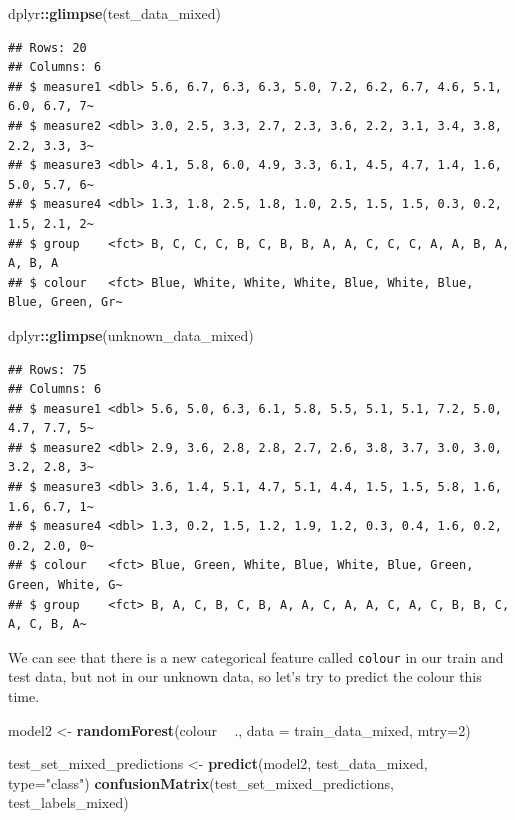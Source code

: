 \documentclass[
]{book}
\newenvironment{Shaded}{\begin{snugshade}}{\end{snugshade}}
\newcommand{\DataTypeTok}[1]{\textcolor[rgb]{0.13,0.29,0.53}{#1}}
\newcommand{\DecValTok}[1]{\textcolor[rgb]{0.00,0.00,0.81}{#1}}
\newcommand{\KeywordTok}[1]{\textcolor[rgb]{0.13,0.29,0.53}{\textbf{#1}}}
\newcommand{\NormalTok}[1]{#1}
\newcommand{\OperatorTok}[1]{\textcolor[rgb]{0.81,0.36,0.00}{\textbf{#1}}}
\newcommand{\StringTok}[1]{\textcolor[rgb]{0.31,0.60,0.02}{#1}}
\begin{document}
\begin{Shaded}
\begin{Highlighting}[]
\NormalTok{dplyr}\OperatorTok{::}\KeywordTok{glimpse}\NormalTok{(test_data_mixed)}
\end{Highlighting}
\end{Shaded}

\begin{verbatim}
## Rows: 20
## Columns: 6
## $ measure1 <dbl> 5.6, 6.7, 6.3, 6.3, 5.0, 7.2, 6.2, 6.7, 4.6, 5.1, 6.0, 6.7, 7~
## $ measure2 <dbl> 3.0, 2.5, 3.3, 2.7, 2.3, 3.6, 2.2, 3.1, 3.4, 3.8, 2.2, 3.3, 3~
## $ measure3 <dbl> 4.1, 5.8, 6.0, 4.9, 3.3, 6.1, 4.5, 4.7, 1.4, 1.6, 5.0, 5.7, 6~
## $ measure4 <dbl> 1.3, 1.8, 2.5, 1.8, 1.0, 2.5, 1.5, 1.5, 0.3, 0.2, 1.5, 2.1, 2~
## $ group    <fct> B, C, C, C, B, C, B, B, A, A, C, C, C, A, A, B, A, A, B, A
## $ colour   <fct> Blue, White, White, White, Blue, White, Blue, Blue, Green, Gr~
\end{verbatim}

\begin{Shaded}
\begin{Highlighting}[]
\NormalTok{dplyr}\OperatorTok{::}\KeywordTok{glimpse}\NormalTok{(unknown_data_mixed)}
\end{Highlighting}
\end{Shaded}

\begin{verbatim}
## Rows: 75
## Columns: 6
## $ measure1 <dbl> 5.6, 5.0, 6.3, 6.1, 5.8, 5.5, 5.1, 5.1, 7.2, 5.0, 4.7, 7.7, 5~
## $ measure2 <dbl> 2.9, 3.6, 2.8, 2.8, 2.7, 2.6, 3.8, 3.7, 3.0, 3.0, 3.2, 2.8, 3~
## $ measure3 <dbl> 3.6, 1.4, 5.1, 4.7, 5.1, 4.4, 1.5, 1.5, 5.8, 1.6, 1.6, 6.7, 1~
## $ measure4 <dbl> 1.3, 0.2, 1.5, 1.2, 1.9, 1.2, 0.3, 0.4, 1.6, 0.2, 0.2, 2.0, 0~
## $ colour   <fct> Blue, Green, White, Blue, White, Blue, Green, Green, White, G~
## $ group    <fct> B, A, C, B, C, B, A, A, C, A, A, C, A, C, B, B, C, A, C, B, A~
\end{verbatim}

We can see that there is a new categorical feature called \texttt{colour} in our train and test data, but not in our unknown data, so let's try to predict the colour this time.

\begin{Shaded}
\begin{Highlighting}[]
\NormalTok{model2 <-}\StringTok{ }\KeywordTok{randomForest}\NormalTok{(colour }\OperatorTok{~}\StringTok{ }\NormalTok{., }\DataTypeTok{data =}\NormalTok{ train_data_mixed, }\DataTypeTok{mtry=}\DecValTok{2}\NormalTok{)}

\NormalTok{test_set_mixed_predictions <-}\StringTok{ }\KeywordTok{predict}\NormalTok{(model2, test_data_mixed, }\DataTypeTok{type=}\StringTok{"class"}\NormalTok{)}
\KeywordTok{confusionMatrix}\NormalTok{(test_set_mixed_predictions, test_labels_mixed)}
\end{Highlighting}
\end{Shaded}
\end{document}
